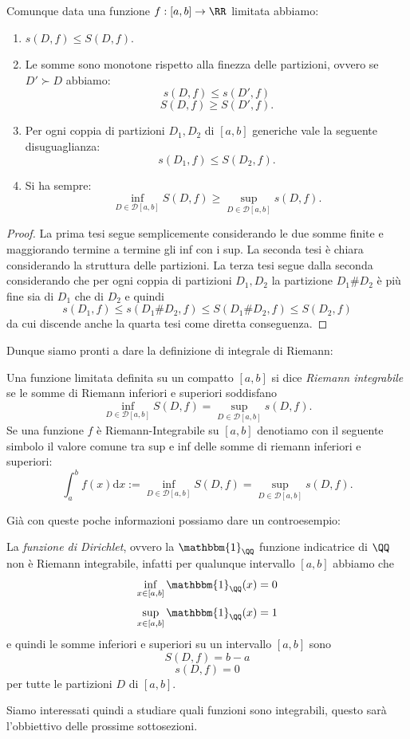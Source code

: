 \documentclass[11pt]{scrartcl}
\newcommand{\dif}{\text{d}}
\begin{document}
	\begin{proposition}
		Comunque data una funzione $f:[a,b]\to\RR$ limitata abbiamo:
		\begin{enumerate}
			\item $s(D,f)\le S(D,f)$.
			\item Le somme sono monotone rispetto alla finezza delle partizioni, ovvero se $D'\succ D$ abbiamo:
			$$s(D,f)\le s(D',f)$$
			$$S(D,f)\ge S(D',f).$$
			\item Per ogni coppia di partizioni $D_1,D_2$ di $[a,b]$ generiche vale la seguente disuguaglianza:
			$$s(D_1,f)\le S(D_2,f).$$
			\item Si ha sempre:
			$$\inf_{D\in \mathcal{D}[a,b]}S(D,f)\ge \sup_{D\in\mathcal{D}[a,b]}s(D,f).$$
		\end{enumerate}
	\end{proposition}
	\begin{proof}
		La prima tesi segue semplicemente considerando le due somme finite e maggiorando termine a termine gli inf con i sup. La seconda tesi è chiara considerando la struttura delle partizioni. La terza tesi segue dalla seconda considerando che per ogni coppia di partizioni $D_1,D_2$ la partizione $D_1\#D_2$ è più fine sia di $D_1$ che di $D_2$ e quindi
		$$s(D_1,f)\le s(D_1\#D_2,f)\le S(D_1\#D_2,f)\le S(D_2,f)$$
		da cui discende anche la quarta tesi come diretta conseguenza.
	\end{proof}
	Dunque siamo pronti a dare la definizione di integrale di Riemann:
	\begin{definition}
		Una funzione limitata definita su un compatto $[a,b]$ si dice \textit{Riemann integrabile} se le somme di Riemann inferiori e superiori soddisfano
		$$\inf_{D\in \mathcal{D}[a,b]}S(D,f)=\sup_{D\in\mathcal{D}[a,b]}s(D,f).$$
		Se una funzione $f$ è Riemann-Integrabile su $[a,b]$ denotiamo con il seguente simbolo il valore comune tra sup e inf delle somme di riemann inferiori e superiori:
		$$\int_a^bf(x)\dif x:=\inf_{D\in \mathcal{D}[a,b]}S(D,f)=\sup_{D\in\mathcal{D}[a,b]}s(D,f).$$
	\end{definition}
	Già con queste poche informazioni possiamo dare un controesempio:
	\begin{example}
		La \textit{funzione di Dirichlet}, ovvero la $\mathbbm{1}_\QQ$ funzione indicatrice di $\QQ$ non è Riemann integrabile, infatti per qualunque intervallo $[a,b]$ abbiamo che 
		$$\inf_{x\in [a,b]}\mathbbm{1}_\QQ(x)=0$$
		$$\sup_{x\in [a,b]}\mathbbm{1}_\QQ(x)=1$$
		e quindi le somme inferiori e superiori su un intervallo $[a,b]$ sono
		$$S(D,f)=b-a$$
		$$s(D,f)=0$$
		per tutte le partizioni $D$ di $[a,b]$.
	\end{example}
	Siamo interessati quindi a studiare quali funzioni sono integrabili, questo sarà l'obbiettivo delle prossime sottosezioni.
\end{document}
